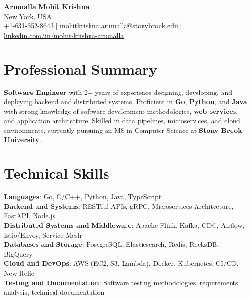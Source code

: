 \documentclass[letterpaper,11pt]{article}
\begin{document}
\begin{center}
  {\Large \textbf{Arumalla Mohit Krishna}} \\
  New York, USA \\
  +1-631-352-8643 \enspace | \enspace mohitkrishna.arumalla@stonybrook.edu \enspace | \enspace \href{https://www.linkedin.com/in/mohit-krishna-arumalla}{linkedin.com/in/mohit-krishna-arumalla}
\end{center}

\section{Professional Summary}
  \begin{itemize}[leftmargin=0.15in, label={}]
    \small{\item{
     \textbf{Software Engineer} with 2+ years of experience designing, developing, and deploying backend and distributed systems. Proficient in \textbf{Go}, \textbf{Python}, and \textbf{Java} with strong knowledge of software development methodologies, \textbf{web services}, and application architecture. Skilled in data pipelines, microservices, and cloud environments, currently pursuing an MS in Computer Science at \textbf{Stony Brook University}.
    }}
  \end{itemize}
\vspace{-16pt}

\section{Technical Skills}
 \begin{itemize}[leftmargin=0.15in, label={}]
    \small{\item{
     \textbf{Languages}: Go, C/C++, Python, Java, TypeScript \\
     \textbf{Backend and Systems}: RESTful APIs, gRPC, Microservices Architecture, FastAPI, Node.js \\
     \textbf{Distributed Systems and Middleware}: Apache Flink, Kafka, CDC, Airflow, Istio/Envoy, Service Mesh \\
     \textbf{Databases and Storage}: PostgreSQL, Elasticsearch, Redis, RocksDB, BigQuery \\
     \textbf{Cloud and DevOps}: AWS (EC2, S3, Lambda), Docker, Kubernetes, CI/CD, New Relic \\
     \textbf{Testing and Documentation}: Software testing methodologies, requirements analysis, technical documentation \\
    }}
 \end{itemize}
\vspace{-16pt}
\end{document}
